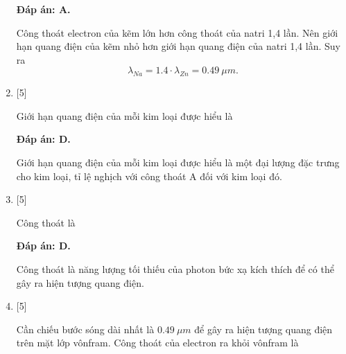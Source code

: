 \begin{enumerate}[label=\bfseries Câu \arabic*:]
	\loigiai
	{		\textbf{Đáp án: A.}
		
		Công thoát electron của kẽm lớn hơn công thoát của natri 1,4 lần. Nên giới hạn quang điện của kẽm nhỏ hơn giới hạn quang điện của natri 1,4 lần. Suy ra
		$$
		\lambda_{Na} = \num{1,4} \cdot \lambda_{Zn} = \SI{0,49}{\mu m}.
		$$
	}
	
	\item {} [5]
	\cauhoi
	{Giới hạn quang điện của mỗi kim loại được hiểu là
	}
	
	\loigiai
	{		\textbf{Đáp án: D.}
		
		Giới hạn quang điện của mỗi kim loại được hiểu là một đại lượng đặc trưng cho kim loại, tỉ lệ nghịch với công thoát A đối với kim loại đó.
	}
	
	\item {} [5]
	\cauhoi
	{Công thoát là
	}
	
	\loigiai
	{		\textbf{Đáp án: D.}
		
		Công thoát là năng lượng tối thiếu của photon bức xạ kích thích để có thể gây ra hiện tượng quang điện. 
	}
	
	\item {} [5]
		\cauhoi
	{Cần chiếu bước sóng dài nhất là $\SI{0,49}{\mu m}$ để gây ra hiện tượng quang điện trên mặt lớp vônfram. Công thoát của electron ra khỏi vônfram là 
	}
	

\end{enumerate}
